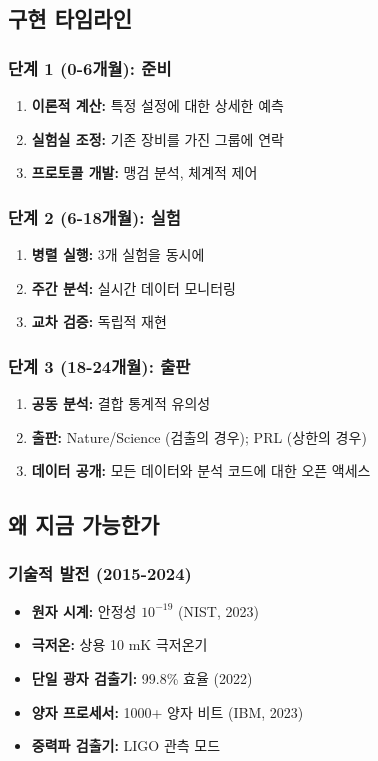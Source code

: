 \documentclass[11pt,a4paper]{article}
\begin{document}
\subsection{구현 타임라인}

\subsubsection{단계 1 (0-6개월): 준비}
\begin{enumerate}
\item \textbf{이론적 계산:} 특정 설정에 대한 상세한 예측
\item \textbf{실험실 조정:} 기존 장비를 가진 그룹에 연락
\item \textbf{프로토콜 개발:} 맹검 분석, 체계적 제어
\end{enumerate}

\subsubsection{단계 2 (6-18개월): 실험}
\begin{enumerate}
\item \textbf{병렬 실행:} 3개 실험을 동시에
\item \textbf{주간 분석:} 실시간 데이터 모니터링
\item \textbf{교차 검증:} 독립적 재현
\end{enumerate}

\subsubsection{단계 3 (18-24개월): 출판}
\begin{enumerate}
\item \textbf{공동 분석:} 결합 통계적 유의성
\item \textbf{출판:} Nature/Science (검출의 경우); PRL (상한의 경우)
\item \textbf{데이터 공개:} 모든 데이터와 분석 코드에 대한 오픈 액세스
\end{enumerate}

\subsection{왜 지금 가능한가}

\subsubsection{기술적 발전 (2015-2024)}
\begin{itemize}
\item \textbf{원자 시계:} 안정성 $10^{-19}$ (NIST, 2023)
\item \textbf{극저온:} 상용 10 mK 극저온기
\item \textbf{단일 광자 검출기:} 99.8\% 효율 (2022)
\item \textbf{양자 프로세서:} 1000+ 양자 비트 (IBM, 2023)
\item \textbf{중력파 검출기:} LIGO 관측 모드
\end{itemize}
\end{document}
